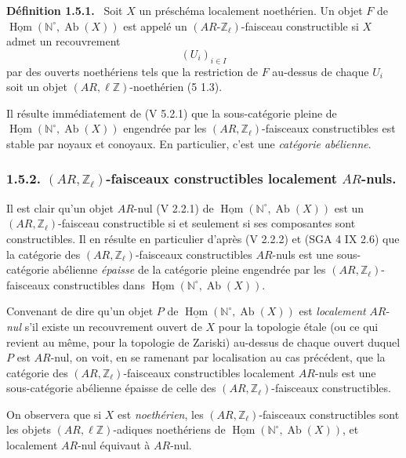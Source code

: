 \documentclass[11pt]{article}
\newenvironment{statement}[1]{\par\medskip\noindent\textbf{#1.}\ }{\par\medskip}
\DeclareMathOperator{\Hom}{Hom}
\providecommand{\uHom}{\underline{\Hom}}
\providecommand{\Hom}{\operatorname{Hom}}
\providecommand{\Ab}{\operatorname{Ab}}
\providecommand{\Ab}{\operatorname{Ab}}
\providecommand{\Hom}{\operatorname{Hom}}
\begin{document}
\begin{statement}{Définition 1.5.1}
Soit \(X\) un préschéma localement noethérien. Un objet \(F\) de \(\uHom(\mathbb N^\circ,\Ab(X))\) est appelé un \((AR\text{-}\mathbb Z_\ell)\)-faisceau constructible si \(X\) admet un recouvrement
\[
(U_i)_{i\in I}
\]
par des
ouverts noethériens tels que la restriction de \(F\) au-dessus de chaque \(U_i\) soit un objet \((AR,\ell\mathbb Z)\)-noethérien (5 1.3).
\end{statement}

Il résulte immédiatement de (V 5.2.1) que la sous-catégorie pleine de \(\uHom(\mathbb N^\circ,\Ab(X))\) engendrée par les \((AR,\mathbb Z_\ell)\)-faisceaux constructibles est stable par noyaux et conoyaux. En particulier, c'est une \emph{catégorie abélienne}.

\subsubsection*{1.5.2. \((AR,\mathbb Z_\ell)\)-faisceaux constructibles localement \(AR\)-nuls.}

Il est clair qu'un objet \(AR\)-nul (V 2.2.1) de \(\uHom(\mathbb N^\circ,\Ab(X))\) est un \((AR,\mathbb Z_\ell)\)-faisceau constructible si et seulement si ses composantes sont constructibles. Il en résulte en particulier d'après (V 2.2.2) et (SGA 4 IX 2.6) que la catégorie des \((AR,\mathbb Z_\ell)\)-faisceaux constructibles \(AR\)-nuls est une sous-catégorie abélienne \emph{épaisse} de la catégorie pleine engendrée par les \((AR,\mathbb Z_\ell)\)-faisceaux constructibles dans \(\uHom(\mathbb N^\circ,\Ab(X))\).

Convenant de dire qu'un objet \(P\) de \(\uHom(\mathbb N^\circ,\Ab(X))\) est \emph{localement} \(AR\)-\emph{nul} s'il existe un recouvrement ouvert de \(X\) pour la topologie étale (ou ce qui revient au même, pour la topologie de Zariski) au-dessus de chaque ouvert duquel \(P\) est \(AR\)-nul, on voit, en se ramenant par localisation au cas précédent, que la catégorie des \((AR,\mathbb Z_\ell)\)-faisceaux constructibles localement \(AR\)-nuls est une sous-catégorie abélienne épaisse de celle des \((AR,\mathbb Z_\ell)\)-faisceaux constructibles.

On observera que si \(X\) est \emph{noethérien}, les \((AR,\mathbb Z_\ell)\)-faisceaux constructibles sont les objets \((AR,\ell\mathbb Z)\)-adiques noethériens de \(\uHom(\mathbb N^\circ,\Ab(X))\), et localement \(AR\)-nul équivaut à \(AR\)-nul.
\end{document}
